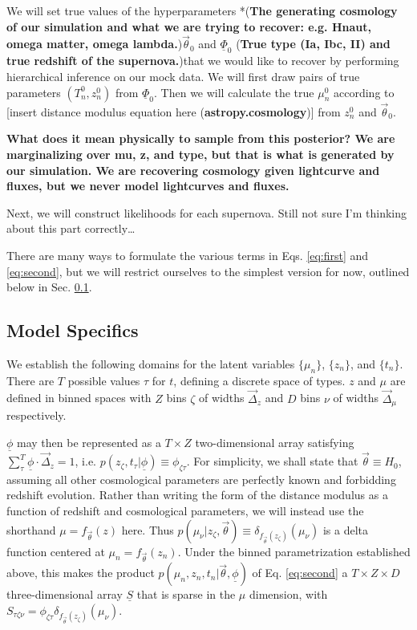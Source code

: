 \documentclass[12pt, onecolumn]{emulateapj}
\newcommand{\textul}{\underline}
\begin{document}
We will set true values of the hyperparameters *({\bf The generating cosmology of our simulation and what we are trying to recover: e.g. Hnaut, omega matter, omega lambda.})$\vec{\theta}_{0}$ and $\textul{\Phi}_{0}$ ({\bf True type (Ia, Ibc, II) and true redshift of the supernova.})that we would like to recover by performing hierarchical inference on our mock data.  We will first draw pairs of true parameters $(T_{n}^{0}, z_{n}^{0})$ from $\textul{\Phi}_{0}$.  Then we will calculate the true $\mu_{n}^{0}$ according to [insert distance modulus equation here ({\bf astropy.cosmology})] from $z_{n}^{0}$ and $\vec{\theta}_{0}$.
 
 {\bf What does it mean physically to sample from this posterior?  We are marginalizing over mu, z, and type, but that is what is generated by our simulation. We are recovering cosmology given lightcurve and fluxes, but we never model lightcurves and fluxes.}
  		  
 Next, we will construct likelihoods for each supernova.  Still not sure I'm thinking about this part correctly\dots

There are many ways to formulate the various terms in Eqs. \ref{eq:first} and \ref{eq:second}, but we will restrict ourselves to the simplest version for now, outlined below in Sec. \ref{sec:choices}.  

\subsection{Model Specifics}
\label{sec:choices}

We establish the following domains for the latent variables $\{\mu_{n}\}$, $\{z_{n}\}$, and $\{t_{n}\}$.  There are $T$ possible values $\tau$ for $t$, defining a discrete space of types.  $z$ and $\mu$ are defined in binned spaces with $Z$ bins $\zeta$ of widths $\vec{\Delta}_{z}$ and $D$ bins $\nu$ of widths $\vec{\Delta}_{\mu}$ respectively.  

$\textul{\phi}$ may then be represented as a $T\times Z$ two-dimensional array satisfying $\sum_{\tau}^{T}\textul{\phi}\cdot\vec{\Delta}_{z}=1$, i.e. $p(z_{\zeta}, t_{\tau} | \textul{\phi}) \equiv \phi_{\zeta\tau}$.  For simplicity, we shall state that $\vec{\theta}\equiv H_{0}$, assuming all other cosmological parameters are perfectly known and forbidding redshift evolution.  Rather than writing the form of the distance modulus as a function of redshift and cosmological parameters, we will instead use the shorthand $\mu = f_{\vec{\theta}}(z)$ here.  Thus $p(\mu_{\nu} | z_{\zeta}, \vec{\theta}) \equiv \delta_{f_{\vec{\theta}}(z_{\zeta})}(\mu_{\nu})$ is a delta function centered at $\mu_{n} = f_{\vec{\theta}}(z_{n})$.  Under the binned parametrization established above, this makes the product $p(\mu_{n}, z_{n}, t_{n} | \vec{\theta}, \textul{\phi})$ of Eq. \ref{eq:second} a $T\times Z\times D$ three-dimensional array $\textul{S}$ that is sparse in the $\mu$ dimension, with $S_{\tau\zeta\nu}=\phi_{\zeta\tau}\delta_{f_{\vec{\theta}}(z_{\zeta})}(\mu_{\nu})$.
\end{document}
